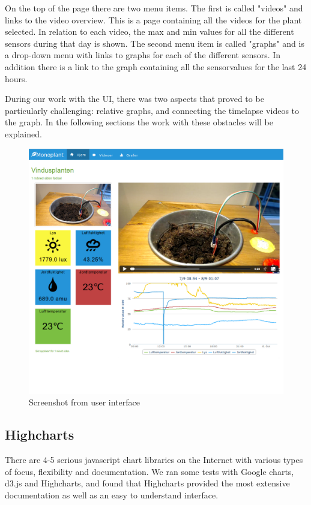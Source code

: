 On the top of the page there are two menu items. The first  is called "videos" and links to the video overview. This is a page containing all the videos for the plant selected. In relation to each video, the max and min values for all the different sensors during that day is shown. The second menu item is called "graphs" and is a drop-down menu with links to graphs for each of the different sensors. In addition there is a link to the graph containing all the sensorvalues for the last 24 hours. 

During our work with the UI, there was two aspects that proved to be particularly challenging: relative graphs, and connecting the timelapse videos to the graph. In the following sections the work with these obstacles will be explained. 

\begin{figure}
\centering
\includegraphics[width=1\textwidth]{img/interface/mainpage.png}
\caption{Screenshot from user interface}
\label{fig:mainpage}
\end{figure}

\subsection{Highcharts}
There are 4-5 serious javascript chart libraries on the Internet with various types of focus, flexibility and documentation. We ran some tests with Google charts, d3.js and Highcharts, and found that Highcharts provided the most extensive documentation as well as an easy to understand interface. 


